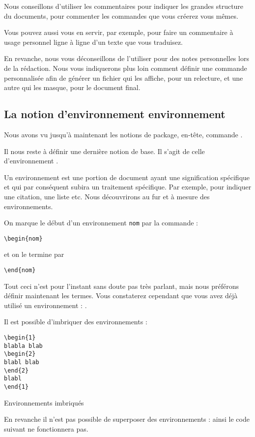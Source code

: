 Nous conseillons d'utiliser les commentaires pour indiquer les grandes structure du documents, pour commenter les commandes que vous créerez vous mêmes. 

Vous pouvez aussi vous en servir, par exemple, pour faire un commentaire à usage personnel ligne à ligne d'un texte que vous traduisez.

En revanche, nous vous déconseillons de l'utiliser pour des notes personnelles lors de la rédaction. Nous vous indiquerons plus loin  comment définir une commande  personnalisée afin de générer un fichier qui les affiche, pour un relecture, et une autre qui les masque, pour le document final.



\subsection{La notion d'environnement environnement }

Nous avons vu jusqu'à maintenant les notions de  package, en-tête, commande . 

Il nous reste à définir une dernière notion de base. Il s'agit de celle d'environnement .

Un environnement  est une portion de document ayant une signification spécifique et qui par conséquent subira un traitement spécifique. Par exemple, pour indiquer une citation, une liste etc. Nous découvrirons au fur et à mesure  des environnements. 


On marque le début d'un environnement  \verb|nom| par la commande  :

\begin{verbatim}
\begin{nom}
\end{verbatim}

et on le termine par 
\begin{verbatim}
\end{nom}
\end{verbatim}

Tout ceci n'est  pour l'instant sans doute pas très parlant, mais nous préférons définir maintenant les termes. Vous constaterez cependant que vous avez déjà utilisé  un environnement  : .


Il est possible d'imbriquer des environnements :
\begin{listing}[ht]
\begin{verbatim}
\begin{1}
blabla blab
\begin{2}
blabl blab
\end{2}
blabl
\end{1}
\end{verbatim}
\caption{Environnements imbriqués}
\end{listing}
\FloatBarrier
En revanche il n'est pas possible de superposer des environnements : ainsi le code suivant ne fonctionnera pas.

